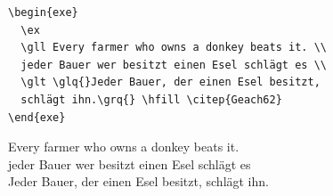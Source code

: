 \begin{frame}[fragile]


\begin{lstlisting}
\begin{exe}
  \ex
  \gll Every farmer who owns a donkey beats it. \\
  jeder Bauer wer besitzt einen Esel schlägt es \\
  \glt \glq{}Jeder Bauer, der einen Esel besitzt, 
  schlägt ihn.\grq{} \hfill \citep{Geach62}
\end{exe} 
\end{lstlisting}


\begin{exe}
	\ex
	\gll Every farmer who owns a donkey beats it. \\
	jeder Bauer wer besitzt einen Esel schlägt es \\
	\glt \glq{}Jeder Bauer, der einen Esel besitzt, 
	schlägt ihn.\grq{} \hfill \citep{Geach62}
\end{exe} 

\end{frame}


